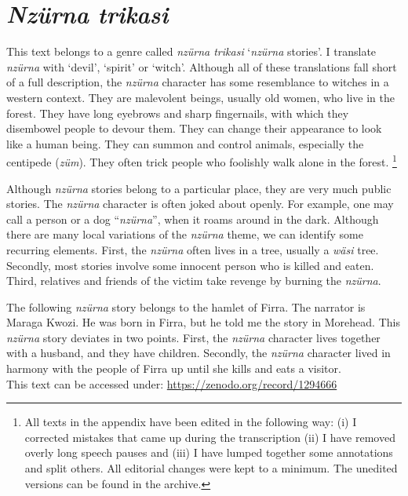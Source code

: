 
\appendix
{}

\section*{\emph{Nzürna trikasi}}\label{nzurna}

This text belongs to a genre called \emph{nzürna trikasi} `\emph{nzürna} stories'. I translate \emph{nzürna} with `devil', `spirit' or `witch'. Although all of these translations fall short of a full description, the \emph{nzürna} character has some resemblance to witches in a western context. They are malevolent beings, usually old women, who live in the forest. They have long eyebrows and sharp fingernails, with which they disembowel people to devour them. They can change their appearance to look like a human being. They can summon and control animals, especially the centipede (\emph{züm}). They often trick people who foolishly walk alone in the forest. \footnote{All texts in the appendix have been edited in the following way: (i) I corrected mistakes that came up during the transcription (ii) I have removed overly long speech pauses and (iii) I have lumped together some annotations and split others. All editorial changes were kept to a minimum. The unedited versions can be found in the archive.}

Although \emph{nzürna} stories belong to a particular place, they are very much public stories. The \emph{nzürna} character is often joked about openly. For example, one may call a person or a dog ``\emph{nzürna}'', when it roams around in the dark. Although there are many local variations of the \emph{nzürna} theme, we can identify some recurring elements. First, the \emph{nzürna} often lives in a tree, usually a \emph{wäsi} tree. Secondly, most stories involve some innocent person who is killed and eaten. Third, relatives and friends of the victim take revenge by burning the \emph{nzürna}.

The following \emph{nzürna} story belongs to the hamlet of Firra. The narrator is Maraga Kwozi. He was born in Firra, but he told me the story in Morehead. This \emph{nzürna} story deviates in two points. First, the \emph{nzürna} character lives together with a husband, and they have children. Secondly, the \emph{nzürna} character lived in harmony with the people of Firra up until she kills and eats a visitor.\\

\noindent
This text can be accessed under: \href{https://zenodo.org/record/1294666}{https://zenodo.org/record/1294666}

